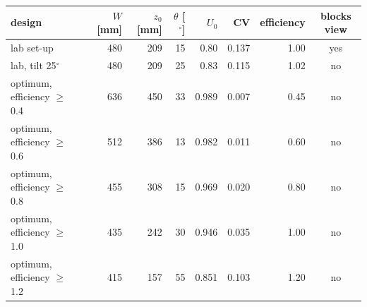 \begin{tabular}{lrrrrrrc}
\toprule
design & $W$ [mm] & $z_0$ [mm] & $\theta$ [$^\circ$] & $U_0$ & CV & efficiency & blocks view \\
\midrule
lab set-up & 480 & 209 & 15 & 0.80 & 0.137 & 1.00 & yes \\
lab, tilt 25$^\circ$ & 480 & 209 & 25 & 0.83 & 0.115 & 1.02 & no \\ \midrule
optimum, efficiency $\ge$ 0.4 & 636 & 450 & 33 & 0.989 & 0.007 & 0.45 & no \\
optimum, efficiency $\ge$ 0.6 & 512 & 386 & 13 & 0.982 & 0.011 & 0.60 & no \\
optimum, efficiency $\ge$ 0.8 & 455 & 308 & 15 & 0.969 & 0.020 & 0.80 & no \\
optimum, efficiency $\ge$ 1.0 & 435 & 242 & 30 & 0.946 & 0.035 & 1.00 & no \\
optimum, efficiency $\ge$ 1.2 & 415 & 157 & 55 & 0.851 & 0.103 & 1.20 & no \\
\bottomrule
\end{tabular}
